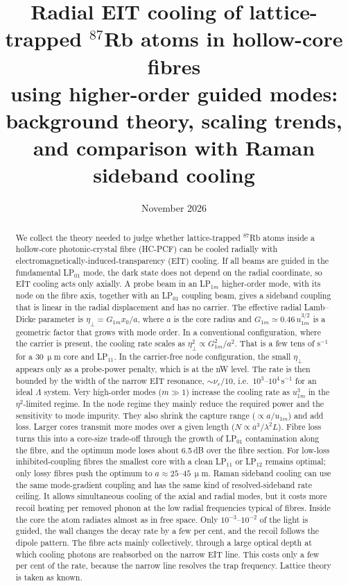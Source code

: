 \documentclass[11pt,a4paper]{article}
\title{Radial EIT cooling of lattice-trapped $^{87}$Rb atoms in hollow-core fibres\\[2pt]
\large using higher-order guided modes: background theory, scaling trends,\\ and comparison with Raman sideband cooling}
\author{}
\date{November 2026}
\newcommand{\micrometre}{\upmu m}\newcommand{\microkelvin}{\upmu K}
\newcommand{\SI}[2]{\ensuremath{#1\,\mathrm{#2}}}
\newcommand{\etaeff}{\eta_{\perp}}
\begin{document}
\maketitle

\begin{abstract}
We collect the theory needed to judge whether lattice-trapped $^{87}$Rb atoms inside a hollow-core photonic-crystal fibre (HC-PCF) can be cooled radially with electromagnetically-induced-transparency (EIT) cooling. If all beams are guided in the fundamental LP$_{01}$ mode, the dark state does not depend on the radial coordinate, so EIT cooling acts only axially. A probe beam in an LP$_{1m}$ higher-order mode, with its node on the fibre axis, together with an LP$_{01}$ coupling beam, gives a sideband coupling that is linear in the radial displacement and has no carrier. The effective radial Lamb--Dicke parameter is $\etaeff=G_{1m}x_0/a$, where $a$ is the core radius and $G_{1m}\simeq 0.46\,u_{1m}^{3/2}$ is a geometric factor that grows with mode order. In a conventional configuration, where the carrier is present, the cooling rate scales as $\etaeff^2\propto G_{1m}^2/a^2$. That is a few tens of s$^{-1}$ for a \SI{30}{\micrometre} core and LP$_{11}$. In the carrier-free node configuration, the small $\etaeff$ appears only as a probe-power penalty, which is at the nW level. The rate is then bounded by the width of the narrow EIT resonance, $\sim\nu_r/10$, i.e.\ $10^3$--$10^4\,$s$^{-1}$ for an ideal $\Lambda$ system. Very high-order modes ($m\gg1$) increase the cooling rate as $u_{1m}^3$ in the $\eta^2$-limited regime. In the node regime they mainly reduce the required power and the sensitivity to mode impurity. They also shrink the capture range ($\propto a/u_{1m}$) and add loss. Larger cores transmit more modes over a given length ($N\propto a^3/\lambda^2L$). Fibre loss turns this into a core-size trade-off through the growth of LP$_{01}$ contamination along the fibre, and the optimum mode loses about 6.5\,dB over the fibre section. For low-loss inhibited-coupling fibres the smallest core with a clean LP$_{11}$ or LP$_{12}$ remains optimal; only lossy fibres push the optimum to $a\approx25$--\SI{45}{\micrometre}. Raman sideband cooling can use the same mode-gradient coupling and has the same kind of resolved-sideband rate ceiling. It allows simultaneous cooling of the axial and radial modes, but it costs more recoil heating per removed phonon at the low radial frequencies typical of fibres. Inside the core the atom radiates almost as in free space. Only $10^{-3}$--$10^{-2}$ of the light is guided, the wall changes the decay rate by a few per cent, and the recoil follows the dipole pattern. The fibre acts mainly collectively, through a large optical depth at which cooling photons are reabsorbed on the narrow EIT line. This costs only a few per cent of the rate, because the narrow line resolves the trap frequency. Lattice theory is taken as known.
\end{abstract}
\end{document}
